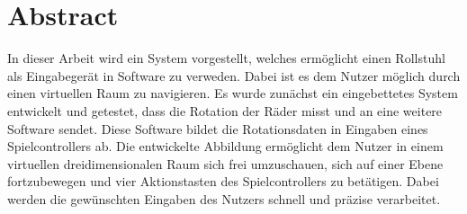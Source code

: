 \chapter*{Abstract}
In dieser Arbeit wird ein System vorgestellt, welches ermöglicht einen Rollstuhl als Eingabegerät in Software zu verweden.
Dabei ist es dem Nutzer möglich durch einen virtuellen Raum zu navigieren.
Es wurde zunächst ein eingebettetes System entwickelt und getestet, dass die Rotation der Räder misst und an eine weitere Software sendet.
Diese Software bildet die Rotationsdaten in Eingaben eines Spielcontrollers ab.
Die entwickelte Abbildung ermöglicht dem Nutzer in einem virtuellen dreidimensionalen Raum sich frei umzuschauen, sich auf einer Ebene fortzubewegen und vier Aktionstasten des Spielcontrollers zu betätigen.
Dabei werden die gewünschten Eingaben des Nutzers schnell und präzise verarbeitet.